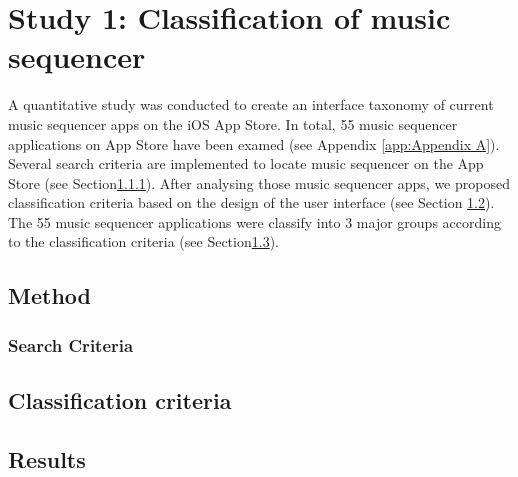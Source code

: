 \chapter{Study 1: Classification of music sequencer}
\label{ch: chapter 3}

A quantitative study was conducted to create an interface taxonomy of current music sequencer apps on the iOS App Store. In total, 55 music sequencer applications on App Store have been examed (see Appendix \ref{app:Appendix A}). Several search criteria are implemented to locate music sequencer on the App Store (see Section\ref{subsec: search criteria}). After analysing those music sequencer apps, we proposed classification criteria based on the design of the user interface (see Section \ref{sec: classify criteria}). The 55 music sequencer applications were classify into 3 major groups according to the classification criteria (see Section\ref{sec: result}).

\section{Method}
\label{sec:method}

\subsection{Search Criteria}
\label{subsec: search criteria}

\section{Classification criteria}
\label{sec: classify criteria}

\section{Results}
\label{sec: result}
